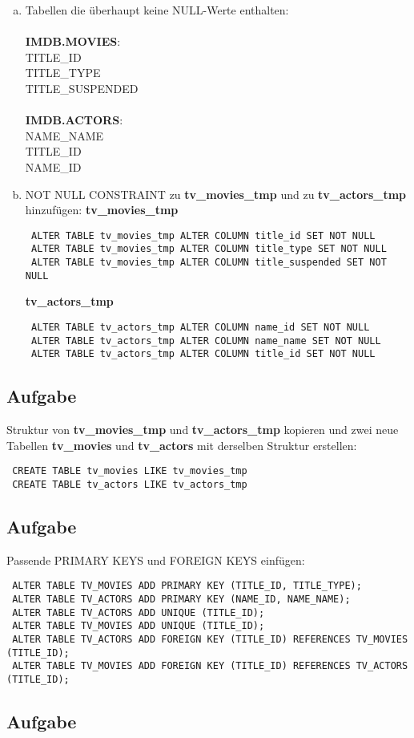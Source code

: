 \documentclass[11pt,a4paper,DIV=9]{scrartcl}
\newcounter{temp}
\newcommand{\aufgabe}[1]{
  \setcounter{temp}{\value{subsection}}
  \setcounter{subsection}{#1}
  \addtocounter{subsection}{-1}
  \subsection{Aufgabe}
  \setcounter{subsection}{\value{temp}}
}
\begin{document}
 \begin{enumerate}[a.]
 \item
 Tabellen die \"uberhaupt keine NULL-Werte enthalten: \\\\
 \textbf{IMDB.MOVIES}: \\
 TITLE\_ID \\
 TITLE\_TYPE \\
 TITLE\_SUSPENDED \\\\
 \textbf{IMDB.ACTORS}: \\
 NAME\_NAME \\
 TITLE\_ID \\
 NAME\_ID \\
 \item
 NOT NULL CONSTRAINT zu \textbf{tv\_movies\_tmp} und zu \textbf{tv\_actors\_tmp} hinzuf\"ugen: 
 \textbf{tv\_movies\_tmp}
 \begin{lstlisting}
 ALTER TABLE tv_movies_tmp ALTER COLUMN title_id SET NOT NULL
 ALTER TABLE tv_movies_tmp ALTER COLUMN title_type SET NOT NULL
 ALTER TABLE tv_movies_tmp ALTER COLUMN title_suspended SET NOT NULL
 \end{lstlisting}
 \textbf{tv\_actors\_tmp}
 \begin{lstlisting}
 ALTER TABLE tv_actors_tmp ALTER COLUMN name_id SET NOT NULL
 ALTER TABLE tv_actors_tmp ALTER COLUMN name_name SET NOT NULL
 ALTER TABLE tv_actors_tmp ALTER COLUMN title_id SET NOT NULL
 \end{lstlisting} 
 \end{enumerate}
 \aufgabe{4}
 Struktur von \textbf{tv\_movies\_tmp} und \textbf{tv\_actors\_tmp} kopieren und zwei neue Tabellen \textbf{tv\_movies} und \textbf{tv\_actors} mit derselben Struktur erstellen: 
 \begin{lstlisting}
 CREATE TABLE tv_movies LIKE tv_movies_tmp
 CREATE TABLE tv_actors LIKE tv_actors_tmp
 \end{lstlisting}
 \aufgabe{5}
 Passende PRIMARY KEYS und FOREIGN KEYS einf\"ugen:
 \begin{lstlisting}
 ALTER TABLE TV_MOVIES ADD PRIMARY KEY (TITLE_ID, TITLE_TYPE);
 ALTER TABLE TV_ACTORS ADD PRIMARY KEY (NAME_ID, NAME_NAME); 
 ALTER TABLE TV_ACTORS ADD UNIQUE (TITLE_ID);
 ALTER TABLE TV_MOVIES ADD UNIQUE (TITLE_ID);
 ALTER TABLE TV_ACTORS ADD FOREIGN KEY (TITLE_ID) REFERENCES TV_MOVIES (TITLE_ID);
 ALTER TABLE TV_MOVIES ADD FOREIGN KEY (TITLE_ID) REFERENCES TV_ACTORS (TITLE_ID);
 \end{lstlisting}
 \aufgabe{6}
\end{document}
